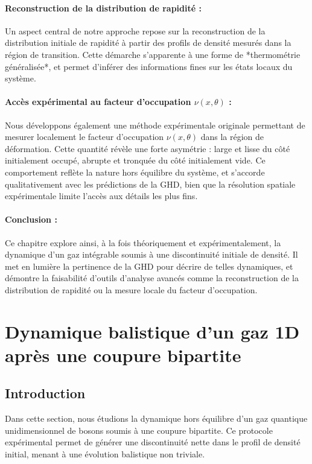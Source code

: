 \paragraph{Reconstruction de la distribution de rapidité :}
Un aspect central de notre approche repose sur la reconstruction de la distribution initiale de rapidité à partir des profils de densité mesurés dans la région de transition. Cette démarche s’apparente à une forme de *thermométrie généralisée*, et permet d’inférer des informations fines sur les états locaux du système.

\paragraph{Accès expérimental au facteur d’occupation $\nu(x,\theta)$ :}
Nous développons également une méthode expérimentale originale permettant de mesurer localement le facteur d’occupation $\nu(x,\theta)$ dans la région de déformation. Cette quantité révèle une forte asymétrie : large et lisse du côté initialement occupé, abrupte et tronquée du côté initialement vide. Ce comportement reflète la nature hors équilibre du système, et s’accorde qualitativement avec les prédictions de la GHD, bien que la résolution spatiale expérimentale limite l’accès aux détails les plus fins.

\paragraph{Conclusion :}
Ce chapitre explore ainsi, à la fois théoriquement et expérimentalement, la dynamique d’un gaz intégrable soumis à une discontinuité initiale de densité. Il met en lumière la pertinence de la GHD pour décrire de telles dynamiques, et démontre la faisabilité d’outils d’analyse avancés comme la reconstruction de la distribution de rapidité ou la mesure locale du facteur d’occupation.


\section{Dynamique balistique d’un gaz 1D après une coupure bipartite}

\subsection*{Introduction}

Dans cette section, nous étudions la dynamique hors équilibre d’un gaz quantique unidimensionnel de bosons soumis à une coupure bipartite. Ce protocole expérimental permet de générer une discontinuité nette dans le profil de densité initial, menant à une évolution balistique non triviale.

